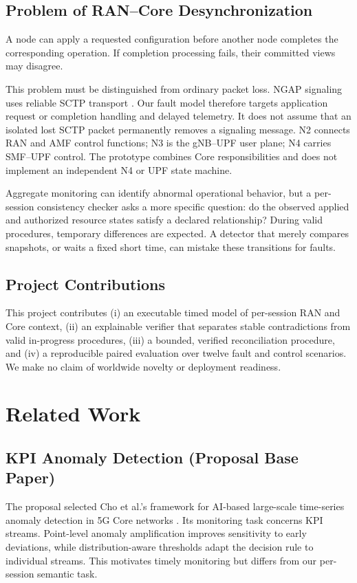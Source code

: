 \documentclass[conference]{IEEEtran}
\begin{document}
\subsection{Problem of RAN--Core Desynchronization}
A node can apply a requested configuration before another node completes the corresponding operation. If completion processing fails, their committed views may disagree.

This problem must be distinguished from ordinary packet loss. NGAP signaling uses reliable SCTP transport \cite{transport}. Our fault model therefore targets application request or completion handling and delayed telemetry. It does not assume that an isolated lost SCTP packet permanently removes a signaling message. N2 connects RAN and AMF control functions; N3 is the gNB--UPF user plane; N4 carries SMF--UPF control. The prototype combines Core responsibilities and does not implement an independent N4 or UPF state machine.

Aggregate monitoring can identify abnormal operational behavior, but a per-session consistency checker asks a more specific question: do the observed applied and authorized resource states satisfy a declared relationship? During valid procedures, temporary differences are expected. A detector that merely compares snapshots, or waits a fixed short time, can mistake these transitions for faults.

\subsection{Project Contributions}
This project contributes (i) an executable timed model of per-session RAN and Core context, (ii) an explainable verifier that separates stable contradictions from valid in-progress procedures, (iii) a bounded, verified reconciliation procedure, and (iv) a reproducible paired evaluation over twelve fault and control scenarios. We make no claim of worldwide novelty or deployment readiness.

\section{Related Work}
\subsection{KPI Anomaly Detection (Proposal Base Paper)}
The proposal selected Cho et al.'s framework for AI-based large-scale time-series anomaly detection in 5G Core networks \cite{cho}. Its monitoring task concerns KPI streams. Point-level anomaly amplification improves sensitivity to early deviations, while distribution-aware thresholds adapt the decision rule to individual streams. This motivates timely monitoring but differs from our per-session semantic task.
\end{document}
